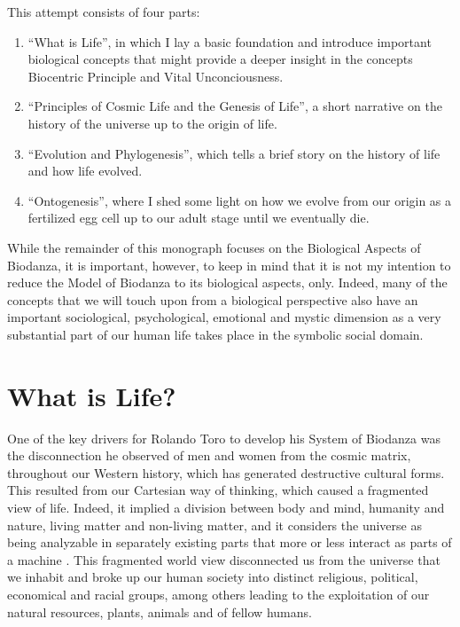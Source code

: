 \documentclass[
  11pt,
]{book}
\begin{document}
This attempt consists of four parts:

\begin{enumerate}
\def\labelenumi{\arabic{enumi}.}
\item
  ``What is Life'', in which I lay a basic foundation and introduce important biological concepts that might provide a deeper insight in the concepts Biocentric Principle and Vital Unconciousness.
\item
  ``Principles of Cosmic Life and the Genesis of Life'', a short narrative on the history of the universe up to the origin of life.
\item
  ``Evolution and Phylogenesis'', which tells a brief story on the history of life and how life evolved.
\item
  ``Ontogenesis'', where I shed some light on how we evolve from our origin as a fertilized egg cell up to our adult stage until we eventually die.
\end{enumerate}

While the remainder of this monograph focuses on the Biological Aspects of Biodanza, it is important, however, to keep in mind that it is not my intention to reduce the Model of Biodanza to its biological aspects, only. Indeed, many of the concepts that we will touch upon from a biological perspective also have an important sociological, psychological, emotional and mystic dimension as a very substantial part of our human life takes place in the symbolic social domain.

\hypertarget{what-is-life}{%
\chapter{What is Life?}\label{what-is-life}}

One of the key drivers for Rolando Toro to develop his System of Biodanza was the disconnection he observed of men and women from the cosmic matrix, throughout our Western history, which has generated destructive cultural forms. This resulted from our Cartesian way of thinking, which caused a fragmented view of life. Indeed, it implied a division between body and mind, humanity and nature, living matter and non-living matter, and it considers the universe as being analyzable in separately existing parts that more or less interact as parts of a machine \citep{bohm1980}. This fragmented world view disconnected us from the universe that we inhabit and broke up our human society into distinct religious, political, economical and racial groups, among others leading to the exploitation of our natural resources, plants, animals and of fellow humans.
\end{document}
